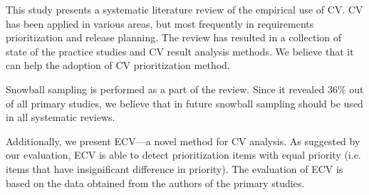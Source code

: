This study presents a systematic literature review of the empirical use of CV.
CV has been applied in various areas, but most frequently in requirements prioritization and release planning.
The review has resulted in a collection of state of the practice studies and CV result analysis methods.
We believe that it can help the adoption of CV prioritization method.

Snowball sampling is performed as a part of the review.
Since it revealed 36\% out of all primary studies, 
we believe that in future snowball sampling should be used in all systematic reviews.

Additionally, we present ECV---a novel method for CV analysis.
As suggested by our evaluation, ECV is able to detect prioritization items with equal priority (i.e. items that have insignificant difference in priority).
The evaluation of ECV is based on the data obtained from the authors of the primary studies.